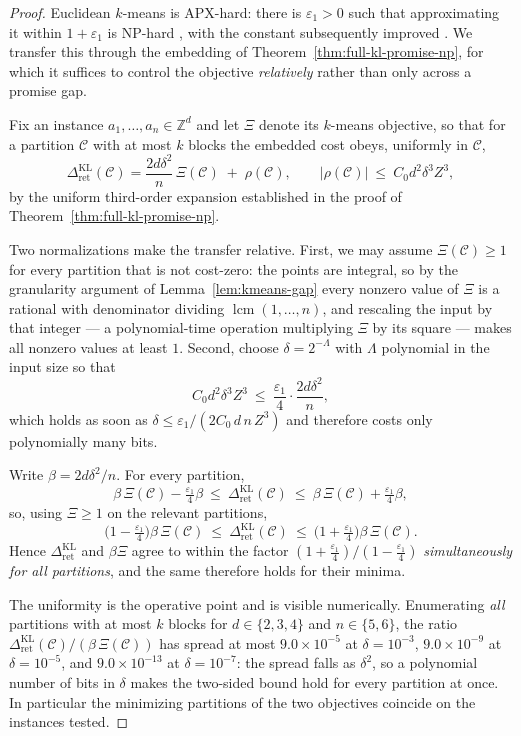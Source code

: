 \documentclass[12pt]{article}
\theoremstyle{definition}
\newcommand{\RetKL}{\Delta_{\mathrm{ret}}^{\mathrm{KL}}}
\begin{document}
\begin{proof}
Euclidean $k$-means is APX-hard: there is $\varepsilon_1>0$ such that
approximating it within $1+\varepsilon_1$ is NP-hard \cite{awasthi2015}, with
the constant subsequently improved \cite{lee2017}.  We transfer this through the
embedding of Theorem~\ref{thm:full-kl-promise-np}, for which it suffices to
control the objective \emph{relatively} rather than only across a promise gap.

Fix an instance $a_1,\dots,a_n\in\mathbb Z^d$ and let $\Xi$ denote its
$k$-means objective, so that for a partition $\mathcal C$ with at most $k$
blocks the embedded cost obeys, uniformly in $\mathcal C$,
\[
\RetKL(\mathcal C)
=
\frac{2d\delta^2}{n}\,\Xi(\mathcal C)\;+\;\rho(\mathcal C),
\qquad
|\rho(\mathcal C)|\ \le\ C_0d^2\delta^3Z^3 ,
\]
by the uniform third-order expansion established in the proof of
Theorem~\ref{thm:full-kl-promise-np}.

Two normalizations make the transfer relative.  First, we may assume
$\Xi(\mathcal C)\ge1$ for every partition that is not cost-zero: the points are
integral, so by the granularity argument of Lemma~\ref{lem:kmeans-gap} every
nonzero value of $\Xi$ is a rational with denominator dividing
$\operatorname{lcm}(1,\dots,n)$, and rescaling the input by that integer --- a
polynomial-time operation multiplying $\Xi$ by its square --- makes all nonzero
values at least $1$.  Second, choose $\delta=2^{-\Lambda}$ with $\Lambda$
polynomial in the input size so that
\[
C_0d^2\delta^3Z^3\ \le\ \frac{\varepsilon_1}{4}\cdot\frac{2d\delta^2}{n},
\]
which holds as soon as $\delta\le\varepsilon_1/(2C_0\,d\,n\,Z^3)$ and therefore
costs only polynomially many bits.

Write $\beta=2d\delta^2/n$.  For every partition,
\[
\beta\,\Xi(\mathcal C)-\tfrac{\varepsilon_1}{4}\beta
\ \le\
\RetKL(\mathcal C)
\ \le\
\beta\,\Xi(\mathcal C)+\tfrac{\varepsilon_1}{4}\beta ,
\]
so, using $\Xi\ge1$ on the relevant partitions,
\[
\bigl(1-\tfrac{\varepsilon_1}{4}\bigr)\beta\,\Xi(\mathcal C)
\ \le\
\RetKL(\mathcal C)
\ \le\
\bigl(1+\tfrac{\varepsilon_1}{4}\bigr)\beta\,\Xi(\mathcal C).
\]
Hence $\RetKL$ and $\beta\Xi$ agree to within the factor
$(1+\tfrac{\varepsilon_1}{4})/(1-\tfrac{\varepsilon_1}{4})$ \emph{simultaneously
for all partitions}, and the same therefore holds for their minima.

The uniformity is the operative point and is visible numerically.  Enumerating
\emph{all} partitions with at most $k$ blocks for $d\in\{2,3,4\}$ and
$n\in\{5,6\}$, the ratio $\RetKL(\mathcal C)/(\beta\,\Xi(\mathcal C))$ has
spread at most $9.0\times10^{-5}$ at $\delta=10^{-3}$, $9.0\times10^{-9}$ at
$\delta=10^{-5}$, and $9.0\times10^{-13}$ at $\delta=10^{-7}$: the spread
falls as $\delta^2$, so a polynomial number of bits in $\delta$ makes the
two-sided bound hold for every partition at once.  In particular the minimizing
partitions of the two objectives coincide on the instances tested.


\end{proof}
\end{document}
